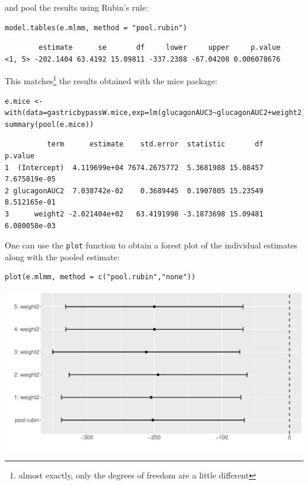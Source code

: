 \documentclass[12pt]{article}
\begin{document}
and pool the results using Rubin's rule:
\lstset{language=r,label= ,caption= ,captionpos=b,numbers=none}
\begin{lstlisting}
model.tables(e.mlmm, method = "pool.rubin")
\end{lstlisting}

\begin{verbatim}
        estimate      se       df     lower     upper     p.value
<1, 5> -202.1404 63.4192 15.09811 -337.2388 -67.04208 0.006078676
\end{verbatim}


This matches\footnote{almost exactly, only the degrees of freedom are a
little different} the results obtained with the mice package:
\lstset{language=r,label= ,caption= ,captionpos=b,numbers=none}
\begin{lstlisting}
e.mice <- with(data=gastricbypassW.mice,exp=lm(glucagonAUC3~glucagonAUC2+weight2))
summary(pool(e.mice))
\end{lstlisting}

\begin{verbatim}
          term      estimate    std.error  statistic       df      p.value
1  (Intercept)  4.119699e+04 7674.2675772  5.3681988 15.08457 7.675819e-05
2 glucagonAUC2  7.038742e-02    0.3689445  0.1907805 15.23549 8.512165e-01
3      weight2 -2.021404e+02   63.4191998 -3.1873698 15.09481 6.080058e-03
\end{verbatim}


\clearpage

One can use the \texttt{plot} function to obtain a forest plot of the
individual estimates along with the pooled estimate:
\lstset{language=r,label= ,caption= ,captionpos=b,numbers=none}
\begin{lstlisting}
plot(e.mlmm, method = c("pool.rubin","none"))
\end{lstlisting}

\begin{center}
\includegraphics[trim={0 0 0 0},width=1\textwidth]{./figures/forestplot.pdf}
\end{center}
\end{document}

